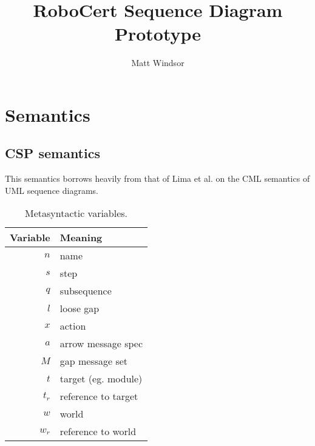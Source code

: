 \documentclass[a4paper,11pt]{report}
\title{RoboCert Sequence Diagram Prototype}
\author{Matt Windsor}
\theoremstyle{definition}
\newcommand{\thead}[1]{\textbf{#1}}
\newcommand{\anarrow}{a}
\newcommand{\anlgap}{l}
\newcommand{\amsgset}{M}
\newcommand{\aname}{n}
\newcommand{\asseq}{q}
\newcommand{\astep}{s}
\newcommand{\atarget}{t}
\newcommand{\aworld}{w}
\newcommand{\anaction}{x}
\newcommand{\refto}[1]{#1_r}
\begin{document}
\maketitle

\chapter{Semantics}

\section{CSP semantics}

This semantics borrows heavily from that of Lima et al. on the CML semantics of
UML sequence diagrams.

\newcommand{\sema}[1]{\llbracket #1 \rrbracket}
\newcommand{\stepsema}[1]{\sema{#1}^{\text{step}}}
\newcommand{\lgapsema}[2]{\sema{#1}^{\text{lgap}}_{(#2)}}
\newcommand{\actsema}[1]{\sema{#1}^{\text{act}}}
\newcommand{\arrsema}[1]{\sema{#1}^{\text{arr}}}
\newcommand{\loopsema}[2]{\sema{#1}^{\text{loop}}_{(#2)}}
\newcommand{\msgsetsema}[1]{\sema{#1}^{\text{mset}}}
\newcommand{\seqsema}[1]{\sema{#1}^{\text{seq}}}
\newcommand{\sseqsema}[1]{\sema{#1}^{\text{sseq}}}

\newcommand{\eventsof}[1]{\mathsf{eventsOf}(#1)}

\begin{table}
	\centering

	\begin{tabular}{rl}
	\toprule
	\thead{Variable} & \thead{Meaning}
	\\
	\midrule
	\(\aname\) & name
	\\
	\(\astep\) & step
	\\
	\(\asseq\) & subsequence
	\\
	\(\anlgap\) & loose gap
	\\
	\(\anaction\) & action
	\\
	\midrule
	\(\anarrow\) & arrow message spec
	\\
	\(\amsgset\) & gap message set
	\\
	\midrule
	\(\atarget\) & target (eg. module)
	\\
	\(\refto{\atarget}\) & reference to target
	\\
	\(\aworld\) & world
	\\
	\(\refto{\aworld}\) & reference to world
	\\
	\bottomrule
	\end{tabular}

	\caption{Metasyntactic variables.}
	\label{tab:metasyntactic-variables}
\end{table}
\end{document}
